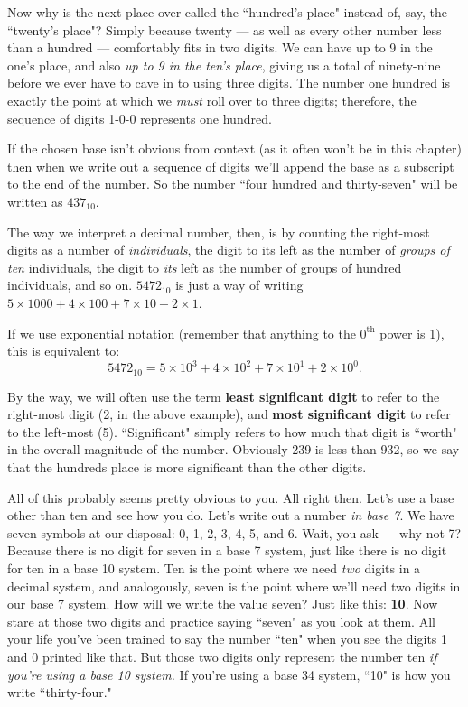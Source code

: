 Now why is the next place over called the ``hundred's place" instead of,
say, the ``twenty's place"? Simply because twenty --- as well as every
other number less than a hundred --- comfortably fits in two digits. We can
have up to 9 in the one's place, and also \textit{up to 9 in the ten's
place}, giving us a total of ninety-nine before we ever have to cave in to
using three digits. The number one hundred is exactly the point at which we
\textit{must} roll over to three digits; therefore, the sequence of digits
1-0-0 represents one hundred.

If the chosen base isn't obvious from context (as it often won't be in this
chapter) then when we write out a sequence of digits we'll append the base
as a subscript to the end of the number. So the number ``four hundred and
thirty-seven" will be written as $437_{10}$.

The way we interpret a decimal number, then, is by counting the right-most
digits as a number of \textit{individuals}, the digit to its left as the
number of \textit{groups of ten} individuals, the digit to \textit{its}
left as the number of groups of hundred individuals, and so on. $5472_{10}$
is just a way of writing $5 \times 1000 + 4 \times 100 + 7 \times 10 + 2
\times 1$.

If we use exponential notation (remember that anything to the
$0^{\text{th}}$ power is 1), this is equivalent to:
\[
5472_{10} = 5 \times 10^3 + 4 \times 10^2 + 7 \times 10^1 + 2 \times 10^0.
\]

By the way, we will often use the term \textbf{least significant digit} to
refer to the right-most digit (2, in the above example), and \textbf{most
significant digit} to refer to the left-most (5). ``Significant" simply
refers to how much that digit is ``worth" in the overall magnitude of the
number. Obviously 239 is less than 932, so we say that the hundreds place
is more significant than the other digits.

All of this probably seems pretty obvious to you. All right then. Let's
use a base other than ten and see how you do. Let's write out a number
\textit{in base 7}. We have seven symbols at our disposal: 0, 1, 2, 3, 4,
5, and 6. Wait, you ask --- why not 7? Because there is no digit for seven
in a base 7 system, just like there is no digit for ten in a base 10
system. Ten is the point where we need \textit{two} digits in a decimal
system, and analogously, seven is the point where we'll need two digits in
our base 7 system. How will we write the value seven? Just like this:
\textbf{10}. Now stare at those two digits and practice saying ``seven" as
you look at them.  All your life you've been trained to say the number
``ten" when you see the digits 1 and 0 printed like that. But those two
digits only represent the number ten \textit{if you're using a base 10
system.} If you're using a base 34 system, ``10" is how you write
``thirty-four."

